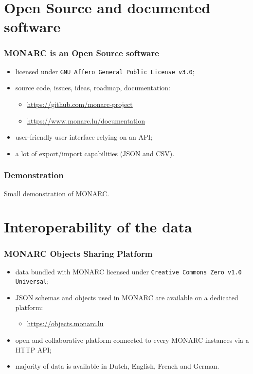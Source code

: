 \documentclass[]{beamer}
\begin{document}
\section{Open Source and documented software}
\begin{frame}
  \frametitle{MONARC is an Open Source software}
  \begin{center}
    \begin{itemize}
      \item licensed under \texttt{GNU Affero General Public License v3.0};
      \item source code, issues, ideas, roadmap, documentation:
        \begin{itemize}
            \item \url{https://github.com/monarc-project}
            \item \url{https://www.monarc.lu/documentation}
        \end{itemize}
      \item user-friendly user interface relying on an API;
      \item a lot of export/import capabilities (JSON and CSV).
    \end{itemize}
  \end{center}
\end{frame}

\begin{frame}
  \frametitle{Demonstration}
  Small demonstration of MONARC.
\end{frame}


\section{Interoperability of the data}
\begin{frame}
  \frametitle{MONARC Objects Sharing Platform}
  \begin{center}
    \begin{itemize}
      \item data bundled with MONARC licensed under \texttt{Creative Commons Zero v1.0 Universal};
      \item JSON schemas and objects used in MONARC are available on a dedicated platform:\\
        \begin{itemize}
            \item \url{https://objects.monarc.lu}
        \end{itemize}
      \item open and collaborative platform connected to every MONARC instances via a HTTP API;
      \item majority of data is available in Dutch, English, French and German.
    \end{itemize}
  \end{center}
\end{frame}
\end{document}
